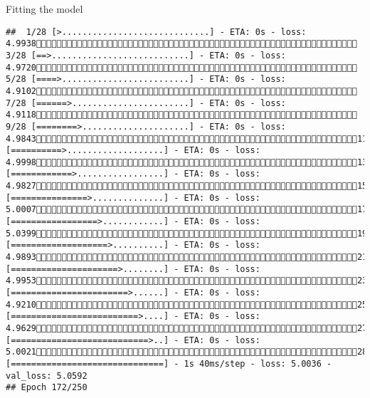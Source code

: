 \documentclass[
  ignorenonframetext,
]{beamer}
\begin{document}
\begin{frame}[fragile]{Fitting the model}
\begin{verbatim}
##  1/28 [>.............................] - ETA: 0s - loss: 4.9938 3/28 [==>...........................] - ETA: 0s - loss: 4.9720 5/28 [====>.........................] - ETA: 0s - loss: 4.9102 7/28 [======>.......................] - ETA: 0s - loss: 4.9118 9/28 [========>.....................] - ETA: 0s - loss: 4.984311/28 [==========>...................] - ETA: 0s - loss: 4.999813/28 [============>.................] - ETA: 0s - loss: 4.982715/28 [===============>..............] - ETA: 0s - loss: 5.000717/28 [=================>............] - ETA: 0s - loss: 5.039919/28 [===================>..........] - ETA: 0s - loss: 4.989321/28 [=====================>........] - ETA: 0s - loss: 4.995323/28 [=======================>......] - ETA: 0s - loss: 4.921025/28 [=========================>....] - ETA: 0s - loss: 4.962927/28 [===========================>..] - ETA: 0s - loss: 5.002128/28 [==============================] - 1s 40ms/step - loss: 5.0036 - val_loss: 5.0592
## Epoch 172/250

\end{verbatim}
\end{frame}
\end{document}
